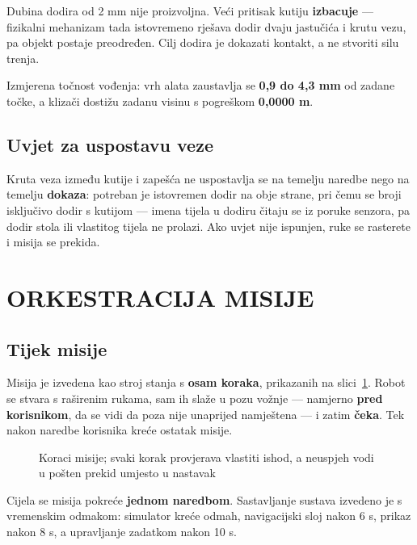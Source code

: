\documentclass[12pt,a4paper]{article}
\begin{document}
Dubina dodira od 2 mm nije proizvoljna. Veći pritisak kutiju \textbf{izbacuje} --- fizikalni
mehanizam tada istovremeno rješava dodir dvaju jastučića i krutu vezu, pa objekt postaje
preodređen. Cilj dodira je dokazati kontakt, a ne stvoriti silu trenja.

Izmjerena točnost vođenja: vrh alata zaustavlja se \textbf{0,9 do 4,3 mm} od zadane točke, a
klizači dostižu zadanu visinu s pogreškom \textbf{0,0000 m}.

\subsection{Uvjet za uspostavu veze}

Kruta veza između kutije i zapešća ne uspostavlja se na temelju naredbe nego na temelju
\textbf{dokaza}: potreban je istovremen dodir na obje strane, pri čemu se broji isključivo dodir
s kutijom --- imena tijela u dodiru čitaju se iz poruke senzora, pa dodir stola ili vlastitog
tijela ne prolazi. Ako uvjet nije ispunjen, ruke se rasterete i misija se prekida.

\section{ORKESTRACIJA MISIJE}
\label{sec:misija}

\subsection{Tijek misije}

Misija je izvedena kao stroj stanja s \textbf{osam koraka}, prikazanih na slici~\ref{fig:misija}.
Robot se stvara s raširenim rukama, sam ih slaže u pozu vožnje --- namjerno \textbf{pred
korisnikom}, da se vidi da poza nije unaprijed namještena --- i zatim \textbf{čeka}. Tek nakon
naredbe korisnika kreće ostatak misije.

\begin{figure}[!htbp]
    \centering
    \resizebox{0.78\textwidth}{!}{}
    \caption{Koraci misije; svaki korak provjerava vlastiti ishod, a neuspjeh vodi u pošten
             prekid umjesto u nastavak}
    \label{fig:misija}
\end{figure}

Cijela se misija pokreće \textbf{jednom naredbom}. Sastavljanje sustava izvedeno je s vremenskim
odmakom: simulator kreće odmah, navigacijski sloj nakon 6 s, prikaz nakon 8 s, a upravljanje
zadatkom nakon 10 s.
\end{document}
